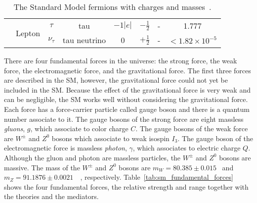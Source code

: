 \begin{table}[htp]
{\begin{tabular}{cccccccc}
                                 & \multirow{2}{*}{Lepton} & $\tau$       & tau               & $-1|e|$             & $-\frac{1}{2}$       & -                 & 1.777\\
                                 &                         & $\nu_{\tau}$ & tau neutrino      & 0                   & $+\frac{1}{2}$       & -                 & $< 1.82 \times 10^{-5}$\\
            \hline
            \hline
        \end{tabular}
    }
    \caption{The Standard Model fermions with charges and masses~\cite{Patrignani:2016xqp}.}
    \label{tab:sm_fermions}
\end{table}%


There are four fundamental forces in the universe: the strong force, the weak force, the electromagnetic force, and the gravitational force.
The first three forces are described in the SM, however, the gravitational force could not yet be included in the SM.
Because the effect of the gravitational force is very weak and can be negligible, the SM works well without considering the gravitational force.
Each force has a force-carrier particle called gauge boson and there is a quantum number associate to it.
The gauge bosons of the strong force are eight massless \textit{gluons}, $g$, which associate to color charge $C$.
The gauge bosons of the weak force are $W^{\pm}$ and $Z^{0}$ bosons which associate to weak isospin $I_{3}$.
The gauge boson of the electromagnetic force is massless \textit{photon}, $\gamma$, which associates to electric charge $Q$.
Although the gluon and photon are massless particles, the $W^{\pm}$ and $Z^{0}$ bosons are massive.
The mass of the $W^{\pm}$ and $Z^{0}$ bosons are $m_{W}=80.385 \pm 0.015$~{\GeV} and $m_{Z}=91.1876 \pm 0.0021$~{\GeV}~\cite{Patrignani:2016xqp}, respectively.
Table~\ref{tab:sm_fundamental_forces} shows the four fundamental forces, the relative strength and range together with the theories and the mediators.

